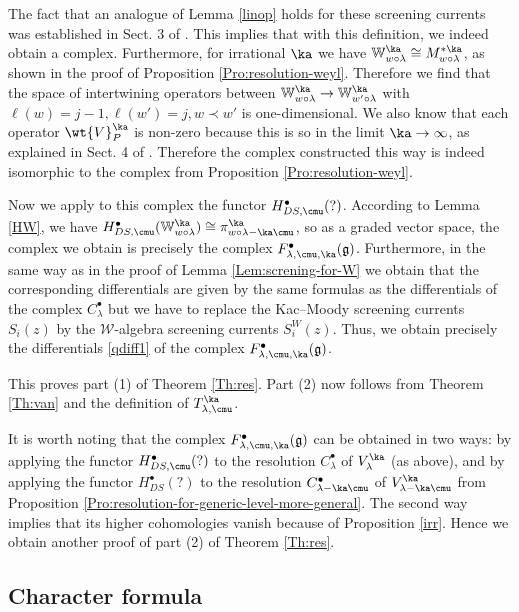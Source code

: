 \documentclass{amsart}
\newcommand{\Wak}[2]{\mathbb{W}_{#1}^{#2}}
\newcommand{\+}{\mathop{\oplus}}
\renewcommand{\*}{{\otimes}}
\newcommand{\mc}{\mathcal}
\newcommand{\mf}{\mathfrak}
\newcommand{\g}{\mf{g}}
\newcommand{\lam}{\lambda}
\theoremstyle{theorem}
\theoremstyle{remark}
\numberwithin{equation}{section}
\begin{document}
The fact that an analogue of Lemma \ref{linop} holds for these
screening currents was established in Sect. 3 of \cite{FF:wak}. This
implies that with this definition, we indeed obtain a
complex. Furthermore, for irrational $\ka$ we have $\Wak{w\circ
  \lam}{\ka} \cong M^{*\ka}_{w\circ \lam}$, as shown in the proof of
Proposition \ref{Pro:resolution-weyl}. Therefore we find that the
space of intertwining operators between $\Wak{w\circ \lam}{\ka} \to
\Wak{w'\circ \lam}{\ka}$ with $\ell(w)=j-1,\ell(w')=j,w\prec w'$ is
one-dimensional. We also know that each operator $\wt{V}_P^\ka$ is
non-zero because this is so in the limit $\ka \to \infty$, as
explained in Sect. 4 of \cite{FF:wak}. Therefore the complex
constructed this way is indeed isomorphic to the complex from
Proposition \ref{Pro:resolution-weyl}.

Now we apply to this complex the functor
$H^\bullet_{DS,\cmu}(?)$. According to Lemma \ref{HW}, we have
$H^\bullet_{DS,\cmu}(\Wak{w\circ \lam}{\ka}) \cong \pi^\ka_{w\circ
  \lam - \ka\cmu}$, so as a graded vector space, the complex we
obtain is precisely the complex
$F^\bullet_{\lam,\cmu,\ka}(\g)$. Furthermore, in the same way as in
the proof of Lemma \ref{Lem:screning-for-W} we obtain that the
corresponding differentials are given by the same formulas as the
differentials of the complex $C^\bullet_\lam$ but we have to replace
the Kac--Moody screening currents $S_i(z)$ by the ${\mc W}$-algebra
screening currents $S^W_i(z)$. Thus, we obtain precisely the
differentials \eqref{qdiff1} of the complex
$F^\bullet_{\lam,\cmu,\ka}(\g)$.

This proves part (1) of Theorem \ref{Th:res}. Part (2) now follows
from Theorem \ref{Th:van} and the definition of $T^\ka_{\lam,\cmu}$.

It is worth noting that the complex $F^\bullet_{\lam,\cmu,\ka}(\g)$
can be obtained in two ways: by applying the functor
$H^\bullet_{DS,\cmu}(?)$ to the resolution $C^\bullet_\lam$ of
$V^\ka_\lam$ (as above), and by applying the functor
$H^\bullet_{DS}(?)$ to the resolution $C^\bullet_{\lam-\ka\cmu}$ of
$V^\ka_{\lam-\ka\cmu}$ from Proposition
\ref{Pro:resolution-for-generic-level-more-general}. The second way
implies that its higher cohomologies vanish because of Proposition
\ref{irr}. Hence we obtain another proof of part (2) of Theorem
\ref{Th:res}.

\subsection{Character formula}    \label{char}
\end{document}
